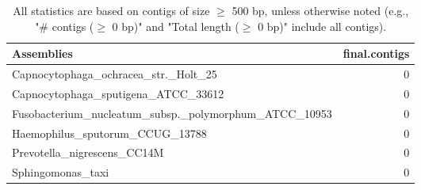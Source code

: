 \documentclass[12pt,a4paper]{article}
\begin{document}
\begin{table}[ht]
\begin{center}
\caption{All statistics are based on contigs of size $\geq$ 500 bp, unless otherwise noted (e.g., "\# contigs ($\geq$ 0 bp)" and "Total length ($\geq$ 0 bp)" include all contigs).}
\begin{tabular}{|l*{1}{|r}|}
\hline
Assemblies & final.contigs \\ \hline
Capnocytophaga\_ochracea\_str.\_Holt\_25 & 0 \\ \hline
Capnocytophaga\_sputigena\_ATCC\_33612 & 0 \\ \hline
Fusobacterium\_nucleatum\_subsp.\_polymorphum\_ATCC\_10953 & 0 \\ \hline
Haemophilus\_sputorum\_CCUG\_13788 & 0 \\ \hline
Prevotella\_nigrescens\_CC14M & 0 \\ \hline
Sphingomonas\_taxi & 0 \\ \hline
\end{tabular}
\end{center}
\end{table}
\end{document}
